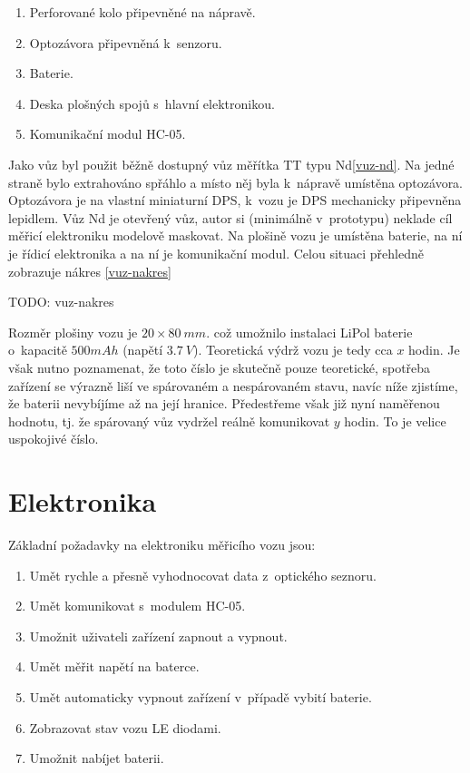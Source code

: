 \begin{enumerate}
\item Perforované kolo připevněné na nápravě.
\item Optozávora připevněná k~senzoru.
\item Baterie.
\item Deska plošných spojů s~hlavní elektronikou.
\item Komunikační modul HC-05.
\end{enumerate}

Jako vůz byl použit běžně dostupný vůz měřítka TT typu Nd\ref{vuz-nd}. Na
jedné straně bylo extrahováno spřáhlo a místo něj byla k~nápravě umístěna
optozávora. Optozávora je na vlastní miniaturní DPS, k~vozu je DPS mechanicky
připevněna lepidlem. Vůz Nd je otevřený vůz, autor si (minimálně v~prototypu)
neklade cíl měřicí elektroniku modelově maskovat. Na plošině vozu je umístěna
baterie, na ní je řídicí elektronika a na ní je komunikační modul. Celou
situaci přehledně zobrazuje nákres \ref{vuz-nakres}

TODO: vuz-nakres

Rozměr plošiny vozu je $20\times80\ mm$. což umožnilo instalaci LiPol baterie
o~kapacitě $500 mAh$ (napětí $3.7\ V$). Teoretická výdrž vozu je tedy cca $x$
hodin. Je však nutno poznamenat, že toto číslo je skutečně pouze teoretické,
spotřeba zařízení se výrazně liší ve spárovaném a nespárovaném stavu, navíc
níže zjistíme, že baterii nevybíjíme až na její hranice. Předestřeme však již
nyní naměřenou hodnotu, tj. že spárovaný vůz vydržel reálně komunikovat
$y$ hodin. To je velice uspokojivé číslo.

\section{Elektronika}
\label{sec:wsm-ele}

Základní požadavky na elektroniku měřicího vozu jsou:

\begin{enumerate}
\item Umět rychle a přesně vyhodnocovat data z~optického seznoru.
\item Umět komunikovat s~modulem HC-05.
\item Umožnit uživateli zařízení zapnout a vypnout.
\item Umět měřit napětí na baterce.
\item Umět automaticky vypnout zařízení v~případě vybití baterie.
\item Zobrazovat stav vozu LE diodami.
\item Umožnit nabíjet baterii.
\end{enumerate}

